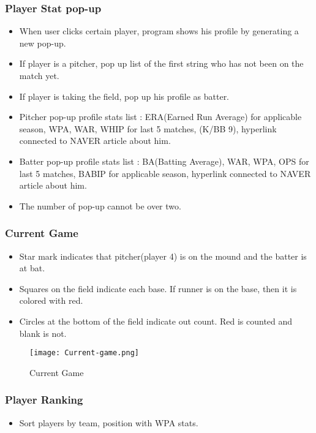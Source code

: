 \documentclass[conference,compsoc, twocolumn]{IEEEtran}
\begin{document}
\subsubsection{Player Stat pop-up}
\begin{itemize}
\item When user clicks certain player, program shows his profile by generating a new pop-up.
\item If player is a pitcher, pop up list of the first string who has not been on the match yet.
\item If player is taking the field, pop up his profile as batter.
\item Pitcher pop-up profile stats list : ERA(Earned Run Average) for applicable season, WPA, WAR, WHIP for last 5 matches, (K/BB 9), hyperlink connected to NAVER article about him.
\item Batter pop-up profile stats list : BA(Batting Average), WAR, WPA, OPS for last 5 matches, BABIP for applicable season, hyperlink connected to NAVER article about him.
\item The number of pop-up cannot be over two.
\end{itemize}


\subsubsection{Current Game}
\begin{itemize}
\item Star mark indicates that pitcher(player 4) is on the mound and the batter is at bat.
\item Squares on the field indicate each base. If runner is on the base, then it is colored with red.
\item Circles at the bottom of the field indicate out count. Red is counted and blank is not.
\end{itemize}

\begin{figure}[H]
\centering\texttt{[image: Current-game.png]}
\caption{Current Game}
\end{figure}

\subsubsection{Player Ranking}
\begin{itemize}
\item Sort players by team, position with WPA stats.
\end{itemize}
\end{document}
